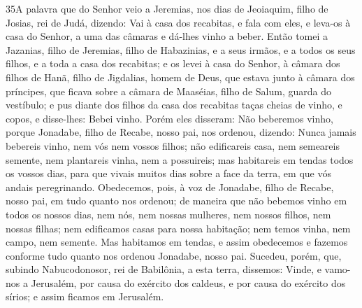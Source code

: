 \medskip

\lettrine{35} A palavra que do Senhor veio a Jeremias, nos
dias de Jeoiaquim, filho de Josias, rei de Judá, dizendo: Vai à
casa dos recabitas, e fala com eles, e leva-os à casa do Senhor, a
uma das câmaras e dá-lhes vinho a beber. Então tomei a Jazanias,
filho de Jeremias, filho de Habazinias, e a seus irmãos, e a todos
os seus filhos, e a toda a casa dos recabitas; e os levei à casa
do Senhor, à câmara dos filhos de Hanã, filho de Jigdalias, homem de
Deus, que estava junto à câmara dos príncipes, que ficava sobre a
câmara de Maaséias, filho de Salum, guarda do vestíbulo; e pus
diante dos filhos da casa dos recabitas taças cheias de vinho, e
copos, e disse-lhes: Bebei vinho. Porém eles disseram: Não
beberemos vinho, porque Jonadabe, filho de Recabe, nosso pai, nos
ordenou, dizendo: Nunca jamais bebereis vinho, nem vós nem vossos
filhos; não edificareis casa, nem semeareis semente, nem
plantareis vinha, nem a possuireis; mas habitareis em tendas todos
os vossos dias, para que vivais muitos dias sobre a face da terra,
em que vós andais peregrinando. Obedecemos, pois, à voz de
Jonadabe, filho de Recabe, nosso pai, em tudo quanto nos ordenou; de
maneira que não bebemos vinho em todos os nossos dias, nem nós, nem
nossas mulheres, nem nossos filhos, nem nossas filhas; nem
edificamos casas para nossa habitação; nem temos vinha, nem campo,
nem semente. Mas habitamos em tendas, e assim obedecemos e
fazemos conforme tudo quanto nos ordenou Jonadabe, nosso pai.
Sucedeu, porém, que, subindo Nabucodonosor, rei de Babilônia,
a esta terra, dissemos: Vinde, e vamo-nos a Jerusalém, por causa do
exército dos caldeus, e por causa do exército dos sírios; e assim
ficamos em Jerusalém.

